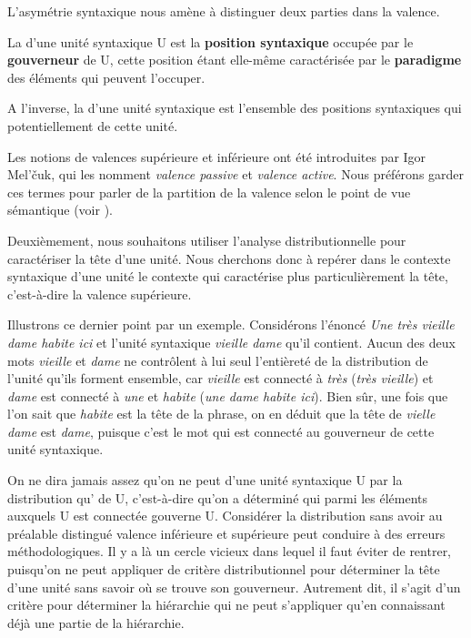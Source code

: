 L’asymétrie syntaxique nous amène à distinguer deux parties dans la valence.

{La  d’une unité syntaxique U est la \textbf{position syntaxique} occupée par le \textbf{gouverneur} de U, cette position étant elle-même caractérisée par le \textbf{paradigme} des éléments qui peuvent l’occuper.}

{A l’inverse, la  d’une unité syntaxique est l’ensemble des positions syntaxiques qui  potentiellement de cette unité.}

Les notions de valences supérieure et inférieure ont été introduites par Igor Mel’čuk, qui les nomment \textit{valence passive} et \textit{valence active}. Nous préférons garder ces termes pour parler de la partition de la valence selon le point de vue sémantique (voir ).

Deuxièmement, nous souhaitons utiliser l’analyse distributionnelle pour caractériser la tête d’une unité. Nous cherchons donc à repérer dans le contexte syntaxique d’une unité le contexte qui caractérise plus particulièrement la tête, c’est-à-dire la valence supérieure.

Illustrons ce dernier point par un exemple. Considérons l’énoncé \textit{Une très vieille dame habite ici} et l’unité syntaxique \textit{vieille dame} qu’il contient. Aucun des deux mots \textit{vieille} et \textit{dame} ne contrôlent à lui seul l’entièreté de la distribution de l’unité qu’ils forment ensemble, car \textit{vieille} est connecté à \textit{très} (\textit{très vieille}) et \textit{dame} est connecté à \textit{une} et \textit{habite} (\textit{une dame habite ici}). Bien sûr, une fois que l’on sait que \textit{habite} est la tête de la phrase, on en déduit que la tête de \textit{vielle dame} est \textit{dame}, puisque c’est le mot qui est connecté au gouverneur de cette unité syntaxique.

On ne dira jamais assez qu’on ne peut  d’une unité syntaxique U par la distribution qu’  de U, c’est-à-dire qu’on a déterminé qui parmi les éléments auxquels U est connectée gouverne U. Considérer la distribution sans avoir au préalable distingué valence inférieure et supérieure peut conduire à des erreurs méthodologiques. Il y a là un cercle vicieux dans lequel il faut éviter de rentrer, puisqu’on ne peut appliquer de critère distributionnel pour déterminer la tête d’une unité sans savoir où se trouve son gouverneur. Autrement dit, il s’agit d’un critère pour déterminer la hiérarchie qui ne peut s’appliquer qu'en connaissant déjà une partie de la hiérarchie.

